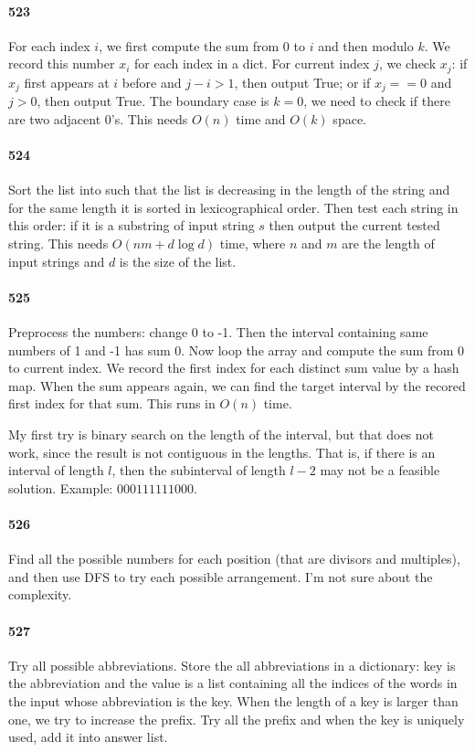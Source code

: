 \documentclass[11pt]{article}
\begin{document}
\paragraph{523}
For each index $i$, we first compute the sum from 0 to $i$ and then modulo $k$. We record this number $x_i$ for each index in a dict.
For current index $j$, we check $x_j$: if $x_j$ first appears at $i$ before and $j - i > 1$, then output True; or if $x_j == 0$ and $j > 0$, then output True.
The boundary case is $k = 0$, we need to check if there are two adjacent 0's.
This needs $O(n)$ time and $O(k)$ space.
 
\paragraph{524}
Sort the list into such that the list is decreasing in the length of the string and for the same length it is sorted in lexicographical order.
Then test each string in this order: if it is a substring of input string $s$ then output the current tested string.
This needs $O(nm + d \log d)$ time, where $n$ and $m$ are the length of input strings and $d$ is the size of the list.

\paragraph{525}
Preprocess the numbers: change 0 to -1.
Then the interval containing same numbers of 1 and -1 has sum 0.
Now loop the array and compute the sum from 0 to current index. 
We record the first index for each distinct sum value by a hash map.
When the sum appears again, we can find the target interval by the recored first index for that sum.
This runs in $O(n)$ time.

My first try is binary search on the length of the interval, but that does not work, since the result is not contiguous in the lengths. That is, if there is an interval of length $l$, then the subinterval of length $l-2$ may not be a feasible solution. Example: $000111111000$.


\paragraph{526}
Find all the possible numbers for each position (that are divisors and multiples), and then use DFS to try each possible arrangement.
I'm not sure about the complexity. 

\paragraph{527}
Try all possible abbreviations. Store the all abbreviations in a dictionary: key is the abbreviation and the value is a list
containing all the indices of the words in the input whose abbreviation is the key. When the length of a key is larger than 
one, we try to increase the prefix. Try all the prefix and when the key is uniquely used, add it into answer list.
\end{document}
